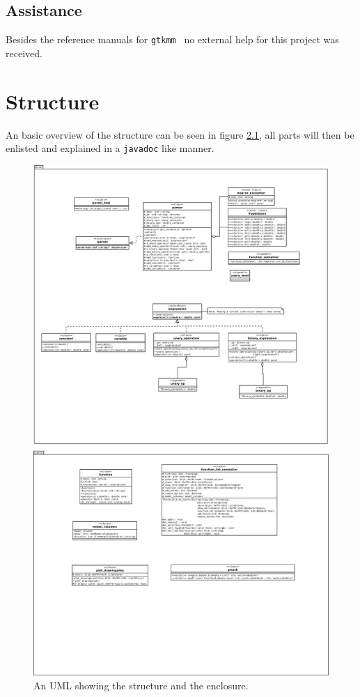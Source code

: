 \documentclass[a4paper,11pt]{kth-mag}
\newcommand{\Gtkmm}{\texttt{gtkmm}}
\begin{document}
\section{Assistance}
Besides the reference manuals for \Gtkmm ~ no external help for this project was
received.

\chapter{Structure}
An basic overview of the structure can be seen in figure \ref{fig:UML}, all
parts will then be enlisted and explained in a \verb+javadoc+ like manner.
\begin{figure}[ht]
\begin{center}
    \includegraphics[width=\textwidth]{uml.pdf}
    \caption{\small{An UML showing the structure and the enclosure.}}\label{fig:UML}
\end{center}
\end{figure}
\end{document}
